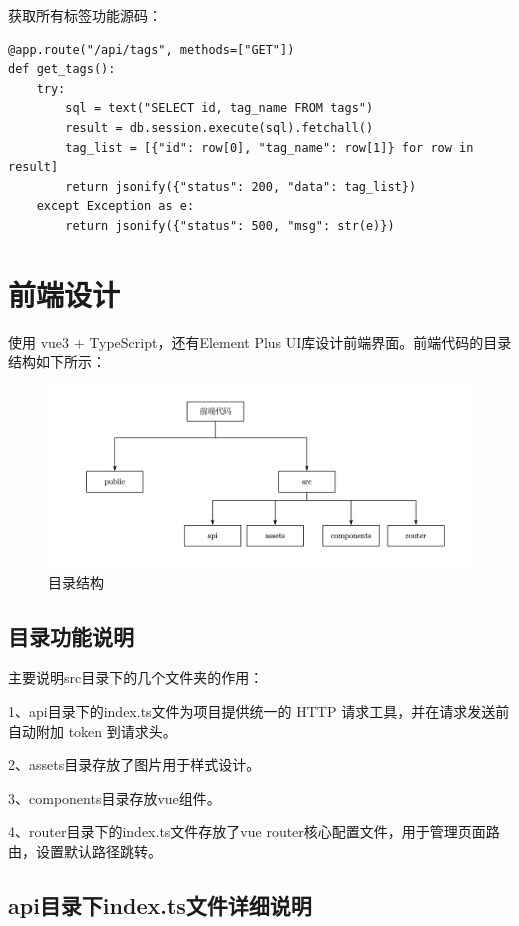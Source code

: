 \documentclass[a4paper,AutoFakeBold={2.7}]{ctexart} %
\begin{document}
获取所有标签功能源码：
\begin{lstlisting}
@app.route("/api/tags", methods=["GET"])
def get_tags():
    try:
        sql = text("SELECT id, tag_name FROM tags")
        result = db.session.execute(sql).fetchall()
        tag_list = [{"id": row[0], "tag_name": row[1]} for row in result]
        return jsonify({"status": 200, "data": tag_list})
    except Exception as e:
        return jsonify({"status": 500, "msg": str(e)})
\end{lstlisting}

\section{前端设计}

使用 vue3 + TypeScript，还有Element Plus UI库设计前端界面。前端代码的目录结构如下所示：

\begin{figure}[H]
	\centering
	\includegraphics[width=\linewidth]{./图片/目录结构.pdf}
	\caption{目录结构}\label{目录结构}
\end{figure}

\subsection{目录功能说明}
主要说明src目录下的几个文件夹的作用：

1、api目录下的index.ts文件为项目提供统一的 HTTP 请求工具，并在请求发送前自动附加 token 到请求头。

2、assets目录存放了图片用于样式设计。

3、components目录存放vue组件。

4、router目录下的index.ts文件存放了vue router核心配置文件，用于管理页面路由，设置默认路径跳转。

\subsection{api目录下index.ts文件详细说明}
\end{document}
